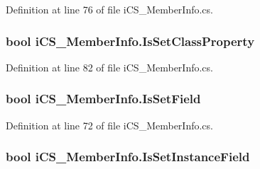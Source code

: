 Definition at line 76 of file i\+C\+S\+\_\+\+Member\+Info.\+cs.

\hypertarget{classi_c_s___member_info_a096efbf93c7f0ce821316e9f56f82588}{
\subsubsection[{Is\+Set\+Class\+Property}]{\setlength{\rightskip}{0pt plus 5cm}bool i\+C\+S\+\_\+\+Member\+Info.\+Is\+Set\+Class\+Property\hspace{0.3cm}{\ttfamily [get]}}}\label{classi_c_s___member_info_a096efbf93c7f0ce821316e9f56f82588}


Definition at line 82 of file i\+C\+S\+\_\+\+Member\+Info.\+cs.

\hypertarget{classi_c_s___member_info_aa5c34f4fa4ce345f5557a517461396a8}{
\subsubsection[{Is\+Set\+Field}]{\setlength{\rightskip}{0pt plus 5cm}bool i\+C\+S\+\_\+\+Member\+Info.\+Is\+Set\+Field\hspace{0.3cm}{\ttfamily [get]}}}\label{classi_c_s___member_info_aa5c34f4fa4ce345f5557a517461396a8}


Definition at line 72 of file i\+C\+S\+\_\+\+Member\+Info.\+cs.

\hypertarget{classi_c_s___member_info_a8b57c45efe5be9c05026a1d082c96319}{
\subsubsection[{Is\+Set\+Instance\+Field}]{\setlength{\rightskip}{0pt plus 5cm}bool i\+C\+S\+\_\+\+Member\+Info.\+Is\+Set\+Instance\+Field\hspace{0.3cm}{\ttfamily [get]}}}\label{classi_c_s___member_info_a8b57c45efe5be9c05026a1d082c96319}



